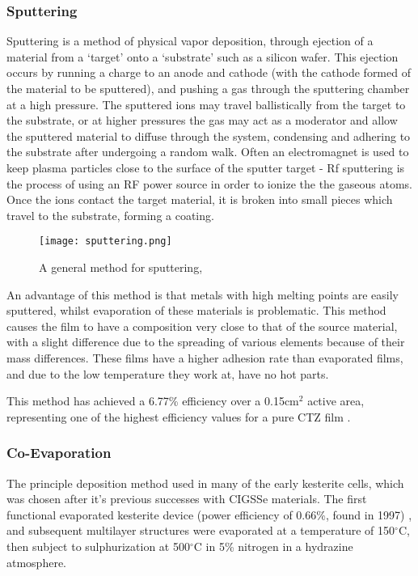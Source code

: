 \subsubsection{Sputtering}
Sputtering is a method of physical vapor deposition, through ejection of a material from a `target' onto a `substrate' such as a silicon wafer. This ejection occurs by running a charge to an anode and cathode (with the cathode formed of the material to be sputtered), and pushing a gas through the sputtering chamber at a high pressure. The sputtered ions may travel ballistically from the target to the substrate, or at higher pressures the gas may act as a moderator and allow the sputtered material to diffuse through the system, condensing and adhering to the substrate after undergoing a random walk.
Often an electromagnet is used to keep plasma particles close to the surface of the sputter target - Rf sputtering is the process of using an RF power source in order to ionize the the gaseous atoms. Once the ions contact the target material, it is broken into small pieces which travel to the substrate, forming a coating.
\begin{figure}
\centering
\texttt{[image: sputtering.png]}
\caption{A general method for sputtering, \citep{wikipedia2014}}
    \label{fig:Sputtering}
\end{figure}
An advantage of this method is that metals with high melting points are easily sputtered, whilst evaporation of these materials is problematic. This method causes the film to have a composition very close to that of the source material, with a slight difference due to the spreading of various elements because of their mass differences. These films have a higher adhesion rate than evaporated films, and due to the low temperature they work at, have no hot parts.

This method has achieved a 6.77\% efficiency over a 0.15cm$^2$ active area, representing one of the highest efficiency values for a pure CTZ film \citep{Mitzi2011}. 
\subsubsection{Co-Evaporation}

The principle deposition method used in many of the early kesterite cells, which was chosen after it's previous successes with CIGSSe materials.
The first functional evaporated kesterite device (power efficiency of 0.66\%, found in 1997) , and subsequent multilayer structures were evaporated at a temperature of 150$^\circ$C, then subject to sulphurization at 500$^\circ$C in 5\% nitrogen in a hydrazine atmosphere.

